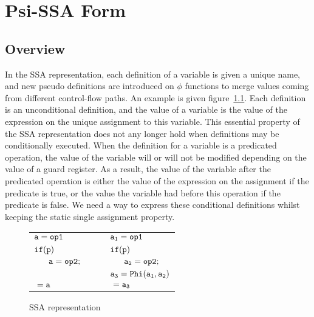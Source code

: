 \chapter{Psi-SSA Form }

\section{Overview}



In the SSA representation, each definition of a variable is given a
unique name, and new pseudo definitions are introduced on $\phi$
functions to merge values coming from different control-flow paths. An
example is given figure~\ref{fig:op_ssa}. Each definition is an
unconditional definition, and the value of a variable is the value of
the expression on the unique assignment to this variable. This
essential property of the SSA representation does not any longer hold
when definitions may be conditionally executed. When the definition
for a variable is a predicated operation, the value of the variable
will or will not be modified depending on the value of a guard
register. As a result, the value of the variable after the predicated
operation is either the value of the expression on the assignment if
the predicate is true, or the value the variable had before this
operation if the predicate is false. We need a way to express these
conditional definitions whilst keeping the static single assignment
property.

\begin{figure}
\begin{center}
\footnotesize
\begin{tabular}{llll}
${\tt a = op1}$ & & & ${\tt a_1 = op1}$ \\
${\tt if (p)}$        & & & ${\tt if (p)}$ \\
${\tt\ \ \ \ \ a = op2;}$ & & & ${\tt \ \ \ \ \ a_2 = op2;}$ \\
& & & ${\tt a_3 = Phi(a_1, a_2)}$ \\
${\tt \ = a}$ & & & ${\tt \ = a_3}$ \\
\end{tabular}
\caption{SSA representation}
\label{fig:op_ssa}
\end{center}
\end{figure}

